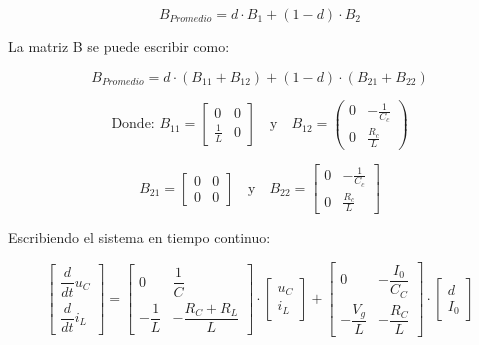 \begin{equation}
    B_{Promedio} = d \cdot B_1 + (1 - d) \cdot B_2
\end{equation}

La matriz B se puede escribir como:

\begin{equation}
    B_{Promedio} = d \cdot (B_11 + B_12) + (1 - d) \cdot (B_21 + B_22)
\end{equation}

\[
\text{Donde: } B_{11} = \begin{bmatrix}
0 & 0 \\
\frac{1}{L} & 0
\end{bmatrix}
\quad \text{y} \quad
B_{12} = \begin{pmatrix}
0 & -\frac{1}{C_c} \\
0 & \frac{R_c}{L}
\end{pmatrix}
\]

\[
B_{21} = \begin{bmatrix}
0 & 0 \\
0 & 0
\end{bmatrix}
\quad \text{y} \quad
B_{22} = \begin{bmatrix}
0 & -\frac{1}{C_c} \\
0 & \frac{R_c}{L}
\end{bmatrix}
\]

Escribiendo el sistema en tiempo continuo:

\begin{equation}
    \begin{bmatrix}
        \dfrac{d}{dt}u_C\\
        \dfrac{d}{dt}i_L
    \end{bmatrix}
    =
    \begin{bmatrix}
        0 & \dfrac{1}{C}\\
        -\dfrac{1}{L} & -\dfrac{R_C + R_L}{L}
    \end{bmatrix}
    \cdot
    \begin{bmatrix}
        u_C\\
        i_L
    \end{bmatrix}
    +
    \begin{bmatrix}
        0 & -\dfrac{I_0}{C_C}\\
        -\dfrac{V_g}{L} & -\dfrac{R_C}{L}
    \end{bmatrix}
    \cdot
    \begin{bmatrix}
        d\\
        I_0
    \end{bmatrix} 
\end{equation}

